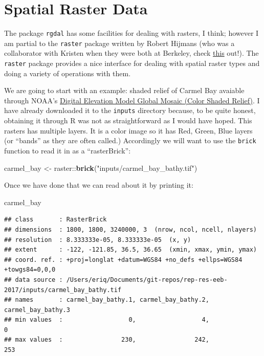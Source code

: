 \documentclass[]{book}
\newenvironment{Shaded}{\begin{snugshade}}{\end{snugshade}}
\newcommand{\KeywordTok}[1]{\textcolor[rgb]{0.13,0.29,0.53}{\textbf{{#1}}}}
\newcommand{\StringTok}[1]{\textcolor[rgb]{0.31,0.60,0.02}{{#1}}}
\newcommand{\NormalTok}[1]{{#1}}
\theoremstyle{definition}
\theoremstyle{definition}
\theoremstyle{remark}
\begin{document}
\section{Spatial Raster Data}\label{spatial-raster-data}

The package \texttt{rgdal} has some facilities for dealing with rasters,
I think; however I am partial to the \texttt{raster} package written by
Robert Hijmans (who was a collaborator with Kristen when they were both
at Berkeley, check
\href{http://onlinelibrary.wiley.com/doi/10.1111/j.1365-2699.2006.01517.x/full}{this}
out!). The \texttt{raster} package provides a nice interface for dealing
with spatial raster types and doing a variety of operations with them.

We are going to start with an example: shaded relief of Carmel Bay
avaiable through NOAA's
\href{http://noaa.maps.arcgis.com/home/item.html?id=feb3c625dc094112bb5281c17679c769}{Digital
Elevation Model Global Mosaic (Color Shaded Relief)}. I have already
downloaded it to the \texttt{inputs} directory because, to be quite
honest, obtaining it through R was not as straightforward as I would
have hoped. This rasters has multiple layers. It is a color image so it
has Red, Green, Blue layers (or ``bands'' as they are often called.)
Accordingly we will want to use the \texttt{brick} function to read it
in as a ``rasterBrick'':

\begin{Shaded}
\begin{Highlighting}[]
\NormalTok{carmel_bay <-}\StringTok{ }\NormalTok{raster::}\KeywordTok{brick}\NormalTok{(}\StringTok{"inputs/carmel_bay_bathy.tif"}\NormalTok{) }
\end{Highlighting}
\end{Shaded}

Once we have done that we can read about it by printing it:

\begin{Shaded}
\begin{Highlighting}[]
\NormalTok{carmel_bay}
\end{Highlighting}
\end{Shaded}

\begin{verbatim}
## class       : RasterBrick 
## dimensions  : 1800, 1800, 3240000, 3  (nrow, ncol, ncell, nlayers)
## resolution  : 8.333333e-05, 8.333333e-05  (x, y)
## extent      : -122, -121.85, 36.5, 36.65  (xmin, xmax, ymin, ymax)
## coord. ref. : +proj=longlat +datum=WGS84 +no_defs +ellps=WGS84 +towgs84=0,0,0 
## data source : /Users/eriq/Documents/git-repos/rep-res-eeb-2017/inputs/carmel_bay_bathy.tif 
## names       : carmel_bay_bathy.1, carmel_bay_bathy.2, carmel_bay_bathy.3 
## min values  :                  0,                  4,                  0 
## max values  :                230,                242,                253
\end{verbatim}
\end{document}
